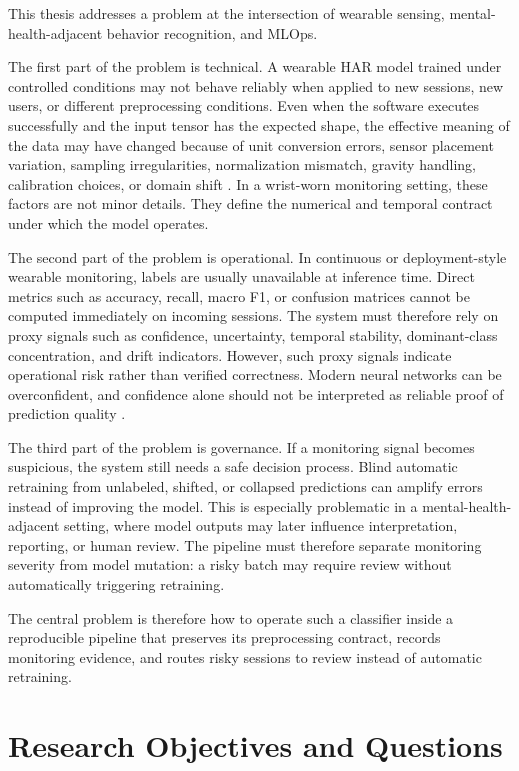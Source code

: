 This thesis addresses a problem at the intersection of wearable sensing, mental-health-adjacent behavior recognition, and MLOps.

The first part of the problem is technical. A wearable HAR model trained under controlled conditions may not behave reliably when applied to new sessions, new users, or different preprocessing conditions. Even when the software executes successfully and the input tensor has the expected shape, the effective meaning of the data may have changed because of unit conversion errors, sensor placement variation, sampling irregularities, normalization mismatch, gravity handling, calibration choices, or domain shift \cite{dhekane2024transfer,wang2024enhancing,oleh2025recognition}. In a wrist-worn monitoring setting, these factors are not minor details. They define the numerical and temporal contract under which the model operates.

The second part of the problem is operational. In continuous or deployment-style wearable monitoring, labels are usually unavailable at inference time. Direct metrics such as accuracy, recall, macro F1, or confusion matrices cannot be computed immediately on incoming sessions. The system must therefore rely on proxy signals such as confidence, uncertainty, temporal stability, dominant-class concentration, and drift indicators. However, such proxy signals indicate operational risk rather than verified correctness. Modern neural networks can be overconfident, and confidence alone should not be interpreted as reliable proof of prediction quality \cite{guo2017calibration,gal2016dropout}.

The third part of the problem is governance. If a monitoring signal becomes suspicious, the system still needs a safe decision process. Blind automatic retraining from unlabeled, shifted, or collapsed predictions can amplify errors instead of improving the model. This is especially problematic in a mental-health-adjacent setting, where model outputs may later influence interpretation, reporting, or human review. The pipeline must therefore separate monitoring severity from model mutation: a risky batch may require review without automatically triggering retraining.

The central problem is therefore how to operate such a classifier inside a reproducible pipeline that preserves its preprocessing contract, records monitoring evidence, and routes risky sessions to review instead of automatic retraining.

\section{Research Objectives and Questions}

